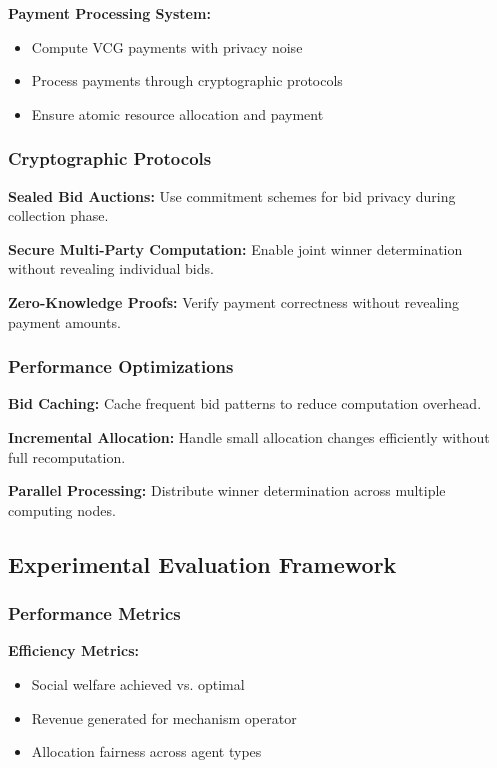 \documentclass[conference]{IEEEtran}
\begin{document}
\textbf{Payment Processing System:}
\begin{itemize}
    \item Compute VCG payments with privacy noise
    \item Process payments through cryptographic protocols
    \item Ensure atomic resource allocation and payment
\end{itemize}

\subsubsection{Cryptographic Protocols}

\textbf{Sealed Bid Auctions:} Use commitment schemes for bid privacy during collection phase.

\textbf{Secure Multi-Party Computation:} Enable joint winner determination without revealing individual bids.

\textbf{Zero-Knowledge Proofs:} Verify payment correctness without revealing payment amounts.

\subsubsection{Performance Optimizations}

\textbf{Bid Caching:} Cache frequent bid patterns to reduce computation overhead.

\textbf{Incremental Allocation:} Handle small allocation changes efficiently without full recomputation.

\textbf{Parallel Processing:} Distribute winner determination across multiple computing nodes.

\subsection{Experimental Evaluation Framework}

\subsubsection{Performance Metrics}

\textbf{Efficiency Metrics:}
\begin{itemize}
    \item Social welfare achieved vs. optimal
    \item Revenue generated for mechanism operator
    \item Allocation fairness across agent types
\end{itemize}
\end{document}

